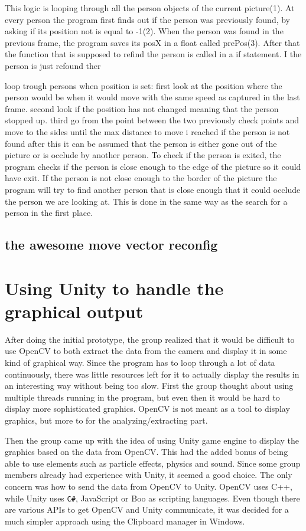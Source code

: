 This logic is looping through all the person objects of the current picture(1). At every person the program first finds out if the person was previously found, by asking if its position not is equal to -1(2). When the person was found in the previous frame, the program saves its posX in a float called prePos(3). After that the function that is supposed to refind the person is called in a if statement. I the person is just refound ther


loop trough persons
when position is set:
	first look at the position where the person would be when it would move with the same speed as captured in the last frame.
	second look if the position has not changed meaning that the person stopped up.
	third go from the point between the two previously check points and move to the sides until the max distance to move i reached
	if the person is not found after this it can be assumed that the person is either gone out of the picture or is occlude by another person. To check if the person is exited, the program checks if the person is close enough to the edge of the picture so it could have exit. If the person is not close enough to the border of the  picture the program will try to find another person that is close enough that it could occlude the person we are looking at.  This is done in the same way as the search for a person in the first place.

\subsection{the awesome move vector reconfig}

\section{Using Unity to handle the graphical output}
After doing the initial prototype, the group realized that it would be difficult to use OpenCV to both extract the data from the camera and display it in some kind of graphical way. Since the program has to loop through a lot of data continuously, there was little resources left for it to actually display the results in an interesting way without being too slow. First the group thought about using multiple threads running in the program, but even then it would be hard to display more sophisticated graphics. OpenCV is not meant as a tool to display graphics, but more to for the analyzing/extracting part.

Then the group came up with the idea of using Unity game engine to display the graphics based on the data from OpenCV. This had the added bonus of being able to use elements such as particle effects, physics and sound. Since some group members already had experience with Unity, it seemed a good choice. The only concern was how to send the data from OpenCV to Unity. OpenCV uses C++, while Unity uses \texttt{C\#}, JavaScript or Boo as scripting languages. Even though there are various APIs to get OpenCV and Unity communicate, it was decided for a much simpler approach using the Clipboard manager in Windows.

